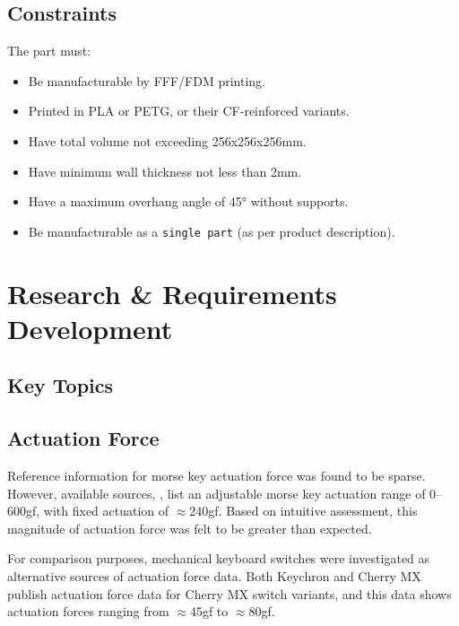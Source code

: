 \documentclass[10pt]{article}
\begin{document}
\subsection{Constraints}
The part must:
\begin{itemize}[leftmargin=*]
	\item Be manufacturable by FFF/FDM printing.
	\item Printed in PLA or PETG, or their CF-reinforced variants.
	\item Have total volume not exceeding 256x256x256mm.
	\item Have minimum wall thickness not less than 2mm.
	\item Have a maximum overhang angle of 45° without supports.
	\item Be manufacturable as a \texttt{single part} (as per product description). %
\end{itemize}

\section{Research \& Requirements Development}
\subsection{Key Topics}

\subsection{Actuation Force}

Reference information for morse key actuation force was found to be sparse. However, available
sources, \cite{ebay2025, eham2025}, list an adjustable morse key actuation range of 0--600gf, with
fixed actuation of $\approx$240gf. Based on intuitive assessment, this magnitude of actuation force
was felt to be greater than expected.

For comparison purposes, mechanical keyboard switches were investigated as alternative sources of
actuation force data. Both Keychron \cite{keychron2025} and Cherry MX \cite{cherry2025} publish
actuation force data for Cherry MX switch variants, and this data shows actuation forces ranging
from $\approx$45gf to $\approx$80gf.
\end{document}
